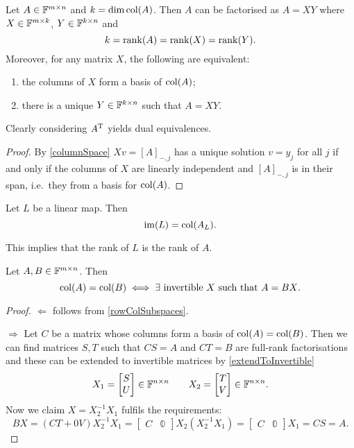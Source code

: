\begin{lemma}
Let $A\in\mathbb{F}^{m\times n}$ and $k=\dim\operatorname{col}(A)$. Then $A$ can be factorised as $A=XY$ where $X\in\mathbb{F}^{m\times k}$, $Y\in\mathbb{F}^{k\times n}$ and
\[ k = \operatorname{rank}(A) = \operatorname{rank}(X) = \operatorname{rank}(Y). \]
Moreover, for any matrix $X$, the following are equivalent:
\begin{enumerate}
\item the columns of $X$ form a basis of $\operatorname{col}(A)$;
\item there is a unique $Y\in\mathbb{F}^{k\times n}$ such that $A=XY$.
\end{enumerate}
Clearly considering $A^{\mathrm{T}}$ yields dual equivalences.
\end{lemma}
\begin{proof}
By \ref{columnSpace} $Xv = [A]_{-,j}$ has a unique solution $v=y_j$ for all $j$ if and only if the columns of $X$ are linearly independent and $[A]_{-,j}$ is in their span, i.e.\ they from a basis for $\operatorname{col}(A)$.
\end{proof}

\begin{proposition} \label{imageColumnSpace}
Let $L$ be a linear map. Then
\[ \operatorname{im}(L) = \operatorname{col}(A_L). \]
\end{proposition}
This implies that the rank of $L$ is the rank of $A$.

\begin{proposition}
Let $A,B\in\mathbb{F}^{m\times n}$. Then
\[ \operatorname{col}(A)=\operatorname{col}(B) \iff \text{$\exists$ invertible $X$ such that $A = BX$}. \]
\end{proposition}
\begin{proof}
$\boxed{\Leftarrow}$ follows from \ref{rowColSubspaces}.

$\boxed{\Rightarrow}$ Let $C$ be a matrix whose columns form a basis of $\operatorname{col}(A)=\operatorname{col}(B)$. Then we can find matrices $S,T$ such that $CS = A$ and $CT = B$ are full-rank factorisations and these can be extended to invertible matrices by \ref{extendToInvertible}
\[ X_1 = \begin{bmatrix}
S \\ U
\end{bmatrix} \in \mathbb{F}^{n\times n} \qquad X_2 = \begin{bmatrix}
T \\ V
\end{bmatrix} \in \mathbb{F}^{n\times n}. \]
Now we claim $X = X_2^{-1}X_1$ fulfils the requirements:
\[ BX = (CT + 0V)X_2^{-1}X_1 = \begin{bmatrix}
C & \mathbb{0}
\end{bmatrix}X_2(X_2^{-1}X_1) = \begin{bmatrix}
C & \mathbb{0}
\end{bmatrix}X_1 = CS = A. \]
\end{proof}

